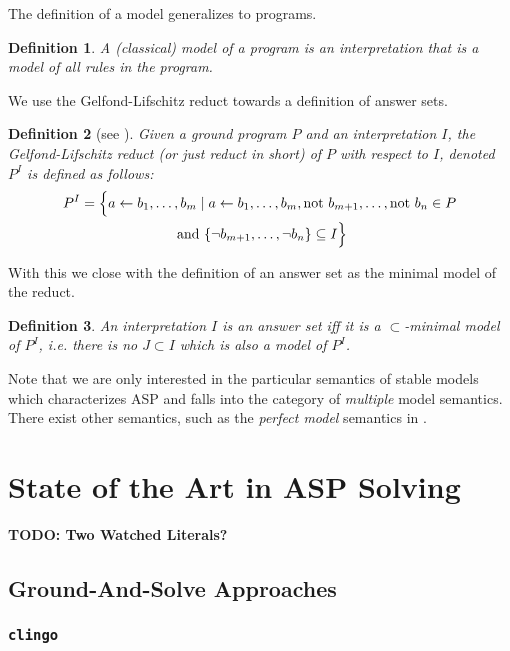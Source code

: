 \documentclass{vutinfth} %
\newcommand{\todo}[1]{{\color{red}\textbf{TODO: {#1}}}} %
\newtheorem{definition}{Definition}[section]
\newcommand{\fail}{\mathrm{not } \ \xspace}
\newcommand{\from}{\ensuremath{\leftarrow}}
\begin{document}
The definition of a model generalizes to programs.

\begin{definition}
A \emph{(classical) model} of a program is an interpretation that is a model of all rules in the program.
\end{definition}

We use the Gelfond-Lifschitz reduct towards a definition of answer sets.

\begin{definition}[see {\cite[Section 2]{DBLP:conf/iclp/GelfondL88}}]
	Given a ground program $P$ and an interpretation $I$, the \emph{Gelfond-Lifschitz reduct} (or just \emph{reduct} in short) of $P$ with respect to $I$, denoted $P^I$ is defined as follows:
\begin{multline*}
P^I = \Bigl\{ a \from b_1, \ldots , b_m \mid a \from b_1, \ldots, b_m, \fail b_{m+1}, \ldots, \fail b_n \in P\\ \text{ and } \{ \neg b_{m+1} , \ldots , \neg b_n \} \subseteq I \Bigr\}
\end{multline*}
\end{definition}

With this we close with the definition of an answer set as the minimal model of the reduct.

\begin{definition}
An interpretation $I$ is an \emph{answer set} iff it is a $\subset$-minimal model of $P^I$, i.e. there is no $J \subset I$ which is also a model of $P^I$.
\end{definition}

Note that we are only interested in the particular semantics of stable models which characterizes ASP and falls into the category of \emph{multiple} model semantics. There exist other semantics, such as the \emph{perfect model} semantics in \cite{DBLP:books/mk/minker88/Przymusinski88}.

\section{State of the Art in ASP Solving}

\todo{Two Watched Literals?}

\subsection{Ground-And-Solve Approaches}

\subsubsection{\texttt{clingo}}
\end{document}
